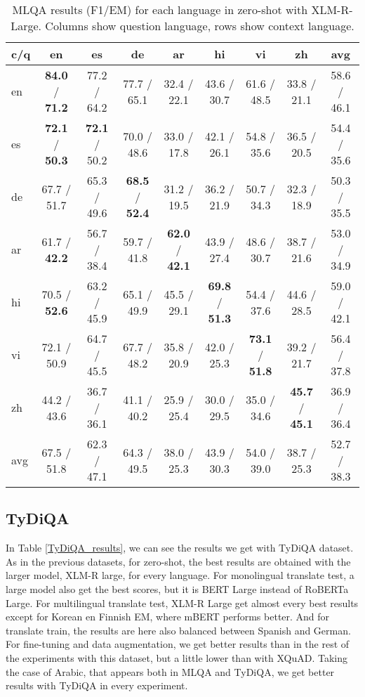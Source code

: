 \documentclass[11pt]{article}
\begin{document}
\begin{table*}[!ht]
    \centering
    \begin{adjustbox}{max width=\textwidth}
    \begin{tabular}{l|ccccccc|c}
    \toprule
        c/q & en & es & de & ar & hi & vi & zh & avg \\ \midrule
        en & \textbf{84.0} / \textbf{71.2} & 77.2 / 64.2 & 77.7 / 65.1 & 32.4 / 22.1 & 43.6 / 30.7 & 61.6 / 48.5 & 33.8 / 21.1 & 58.6 / 46.1 \\ 
        es & \textbf{72.1} / \textbf{50.3} & \textbf{72.1} / 50.2 & 70.0 / 48.6 & 33.0 / 17.8 & 42.1 / 26.1 & 54.8 / 35.6 & 36.5 / 20.5 & 54.4 / 35.6 \\ 
        de & 67.7 / 51.7 & 65.3 / 49.6 & \textbf{68.5} / \textbf{52.4} & 31.2 / 19.5 & 36.2 / 21.9 & 50.7 / 34.3 & 32.3 / 18.9 & 50.3 / 35.5 \\ 
        ar & 61.7 / \textbf{42.2} & 56.7 / 38.4 & 59.7 / 41.8 & \textbf{62.0} / \textbf{42.1} & 43.9 / 27.4 & 48.6 / 30.7 & 38.7 / 21.6 & 53.0 / 34.9 \\ 
        hi & 70.5 / \textbf{52.6} & 63.2 / 45.9 & 65.1 / 49.9 & 45.5 / 29.1 & \textbf{69.8} / \textbf{51.3} & 54.4 / 37.6 & 44.6 / 28.5 & 59.0 / 42.1 \\ 
        vi & 72.1 / 50.9 & 64.7 / 45.5 & 67.7 / 48.2 & 35.8 / 20.9 & 42.0 / 25.3 & \textbf{73.1} / \textbf{51.8} & 39.2 / 21.7 & 56.4 / 37.8 \\ 
        zh & 44.2 / 43.6 & 36.7 / 36.1 & 41.1 / 40.2 & 25.9 / 25.4 & 30.0 / 29.5 & 35.0 / 34.6 & \textbf{45.7} / \textbf{45.1} & 36.9 / 36.4 \\ \midrule
        avg & 67.5 / 51.8 & 62.3 / 47.1 & 64.3 / 49.5 & 38.0 / 25.3 & 43.9 / 30.3 & 54.0 / 39.0 & 38.7 / 25.3 & 52.7 / 38.3 \\ \bottomrule
    \end{tabular}
    \end{adjustbox}
    \caption{MLQA results (F1/EM) for each language in zero-shot with XLM-R-Large. Columns show question language, rows show context language.}
    \label{MLQA_results_ZS_XLM-R-Large}
\end{table*}



\subsection{TyDiQA}

In Table \ref{TyDiQA_results}, we can see the results we get with TyDiQA dataset. As in the previous datasets, for zero-shot, the best results are obtained with the larger model, XLM-R large, for every language. For monolingual translate test, a large model also get the best scores, but it is BERT Large instead of RoBERTa Large. For multilingual translate test, XLM-R Large get almost every best results except for Korean en Finnish EM, where mBERT performs better. And for translate train, the results are here also balanced between Spanish and German. For fine-tuning and data augmentation, we get better results than in the rest of the experiments with this dataset, but a little lower than with XQuAD. Taking the case of Arabic, that appears both in MLQA and TyDiQA, we get better results with TyDiQA in every experiment.
\end{document}
